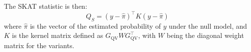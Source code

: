 The SKAT statistic is then:
\[
Q_S = (y - \hat{\pi})^\top K (y - \hat{\pi})
\]
where \( \hat{\pi} \) is the vector of the estimated probability of \( y \) under the null model, and \( K \) is the kernel matrix defined as \( G_{\text{QV}} W G_{\text{QV}}^\top \), with \( W \) being the diagonal weight matrix for the variants.












